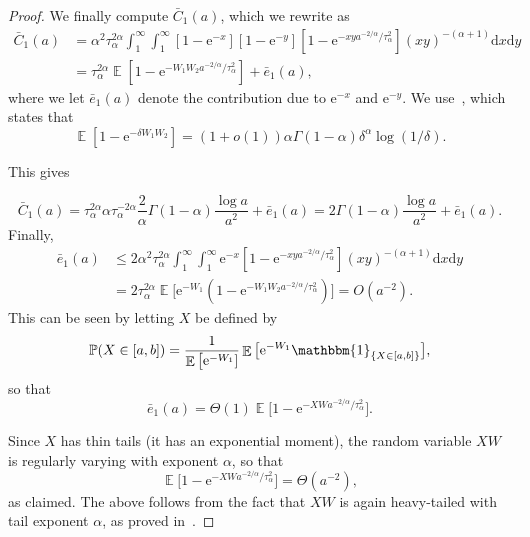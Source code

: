 \documentclass[ twocolumn,
 amsmath,amssymb,
 aps, pre, amsthm, amsfonts,
]{revtex4-2}
\DeclareMathOperator{\EX}{\mathbb{E}}%
\newcommand{\e}{\mathrm{e}}
\newcommand{\prob}{\mathbb{P}}
\newcommand{\nn}{\nonumber}
\begin{document}
\begin{proof}
We finally compute $\bar{C}_1(a)$, which we rewrite as
\begin{align}
    \label{c1-bar-bd}
	\bar{C}_1(a) &=\alpha^2 \tau_\alpha^{2\alpha} 
	\int_{1}^{\infty} \int_{1}^{\infty}[1-\e^{-x}][1-\e^{-y}][1-\e^{-xya^{-2/\alpha}/\tau_\alpha^2}](xy)^{-(\alpha+1)}
	{\mathrm d}x {\mathrm d}y \\
	&=\tau_\alpha^{2\alpha}  \EX[1-\e^{-W_1W_2 a^{-2/\alpha}/\tau_\alpha^2}]+\bar{e}_1(a),\nn
\end{align}
where we let $\bar{e}_1(a)$ denote the contribution due to $\e^{-x}$ and $\e^{-y}$. We use~\cite[(4.6)]{avena2022inhomogeneous}, which states that 
\begin{equation}
    \EX[1-\e^{-\delta W_1 W_2}] =(1+o(1)) \alpha \Gamma(1-\alpha) \delta^{\alpha} \log(1/\delta).
\end{equation}

This gives

\begin{equation}
    \bar{C}_1(a)=\tau_\alpha^{2\alpha} \alpha  \tau_\alpha^{-2\alpha} \frac{2}{\alpha}\Gamma(1-\alpha) \frac{\log{a}}{a^2}+\bar{e}_1(a)
	=2\Gamma(1-\alpha)\frac{\log{a}}{a^2}+\bar{e}_1(a).
\end{equation}
Finally,
\begin{align}
    \bar{e}_1(a) & \leq 2\alpha^2 \tau_\alpha^{2\alpha} 
	\int_{1}^{\infty} \int_{1}^{\infty}\e^{-x}[1-\e^{-xya^{-2/\alpha}/\tau_\alpha^2}](xy)^{-(\alpha+1)}
	{\mathrm d}x {\mathrm d}y \\
	&=2\tau_\alpha^{2\alpha} \EX\big[\e^{-W_1}(1-\e^{-W_1W_2 a^{-2/\alpha}/\tau_\alpha^2})\big]=O(a^{-2}).\nn
\end{align}
This can be seen by letting $X$ be defined by
\begin{equation}
    \prob(X\in [a,b])=\frac{1}{\EX\big[\e^{-W_1}]} \EX\big[\e^{-W_1} \mathbbm{1}_{\{X\in [a,b]\}}\big],
\end{equation}
so that
\begin{equation}
    \bar{e}_1(a)=\Theta(1)  \EX\big[1-\e^{-XW a^{-2/\alpha}/\tau_\alpha^2}\big].
\end{equation}

Since $X$ has thin tails (it has an exponential moment), the random variable $XW$ is regularly varying with exponent $\alpha$, so that
\begin{equation}
    \EX\big[1-\e^{-XW a^{-2/\alpha}/\tau_\alpha^2}\big]=\Theta(a^{-2}),
\end{equation}
as claimed. The above follows from the fact that $XW$ is again heavy-tailed with tail exponent $\alpha$, as proved in~\cite[Proposition 5.2]{LeiSauKon23}.
\end{proof}
\end{document}

